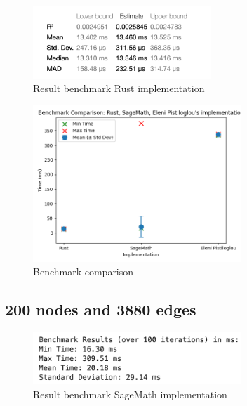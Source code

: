\begin{figure}[!h]
    \centering
    \includegraphics[width=0.60\textwidth]{images/benchmark/graph_200_3896/benchmark_graph_200_3996_rust}
    \caption{Result benchmark Rust implementation}
    \label{fig:benchmark-graph-200-3896-rust}
\end{figure}

\begin{figure}[!h]
    \centering
    \includegraphics[width=0.70\textwidth]{images/benchmark/graph_200_3896/benchmark_comparison_graph_200_3896}
    \caption{Benchmark comparison}
    \label{fig:benchmark-comparison-graph-200-3896}
\end{figure}

\newpage


\subsection{200 nodes and 3880 edges}\label{subsec:result-for-graphs-200-3880}

\begin{figure}[!h]
    \centering
    \includegraphics[width=0.70\textwidth]{images/benchmark/graph_200_3880/benchmark_graph_200_3880_sagemath}
    \caption{Result benchmark SageMath implementation}
    \label{fig:benchmark-graph-200-3880-sagemath}
\end{figure}

